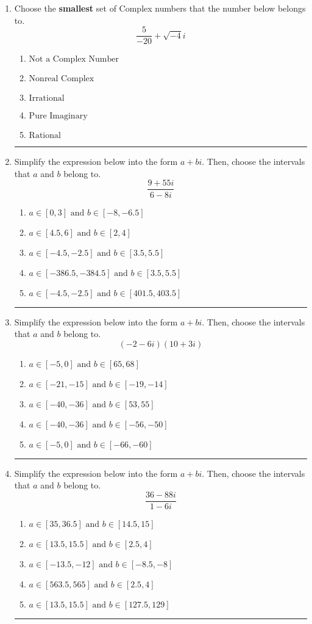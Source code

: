 \documentclass[14pt]{extbook}
\newcommand{\litem}[1]{\item#1\hspace*{-1cm}\rule{\textwidth}{0.4pt}}
\begin{document}
\begin{enumerate}
\litem{
Choose the \textbf{smallest} set of Complex numbers that the number below belongs to.\[ \frac{5}{-20}+\sqrt{-4}i \]\begin{enumerate}[label=\Alph*.]
\item \( \text{Not a Complex Number} \)
\item \( \text{Nonreal Complex} \)
\item \( \text{Irrational} \)
\item \( \text{Pure Imaginary} \)
\item \( \text{Rational} \)

\end{enumerate} }
\litem{
Simplify the expression below into the form $a+bi$. Then, choose the intervals that $a$ and $b$ belong to.\[ \frac{9 + 55 i}{6 - 8 i} \]\begin{enumerate}[label=\Alph*.]
\item \( a \in [0, 3] \text{ and } b \in [-8, -6.5] \)
\item \( a \in [4.5, 6] \text{ and } b \in [2, 4] \)
\item \( a \in [-4.5, -2.5] \text{ and } b \in [3.5, 5.5] \)
\item \( a \in [-386.5, -384.5] \text{ and } b \in [3.5, 5.5] \)
\item \( a \in [-4.5, -2.5] \text{ and } b \in [401.5, 403.5] \)

\end{enumerate} }
\litem{
Simplify the expression below into the form $a+bi$. Then, choose the intervals that $a$ and $b$ belong to.\[ (-2 - 6 i)(10 + 3 i) \]\begin{enumerate}[label=\Alph*.]
\item \( a \in [-5, 0] \text{ and } b \in [65, 68] \)
\item \( a \in [-21, -15] \text{ and } b \in [-19, -14] \)
\item \( a \in [-40, -36] \text{ and } b \in [53, 55] \)
\item \( a \in [-40, -36] \text{ and } b \in [-56, -50] \)
\item \( a \in [-5, 0] \text{ and } b \in [-66, -60] \)

\end{enumerate} }
\litem{
Simplify the expression below into the form $a+bi$. Then, choose the intervals that $a$ and $b$ belong to.\[ \frac{36 - 88 i}{1 - 6 i} \]\begin{enumerate}[label=\Alph*.]
\item \( a \in [35, 36.5] \text{ and } b \in [14.5, 15] \)
\item \( a \in [13.5, 15.5] \text{ and } b \in [2.5, 4] \)
\item \( a \in [-13.5, -12] \text{ and } b \in [-8.5, -8] \)
\item \( a \in [563.5, 565] \text{ and } b \in [2.5, 4] \)
\item \( a \in [13.5, 15.5] \text{ and } b \in [127.5, 129] \)


\end{enumerate}}
\end{enumerate}
\end{document}
